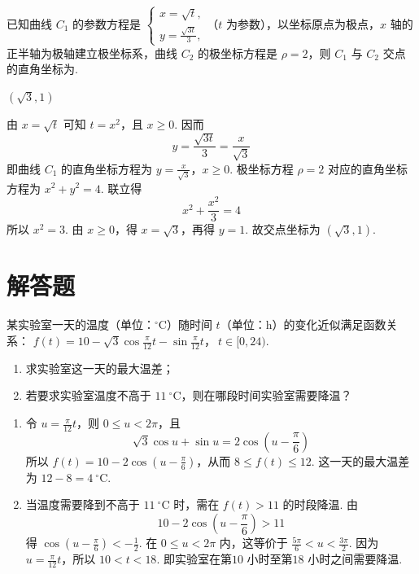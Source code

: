 \begin{problem}
已知曲线 \(C_{1}\) 的参数方程是 \(\begin{cases}
x = \sqrt{t},\\
y = \frac{\sqrt{3t}}{3},
\end{cases}\)（\(t\) 为参数），以坐标原点为极点，\(x\) 轴的正半轴为极轴建立极坐标系，曲线 \(C_{2}\) 的极坐标方程是 \(\rho = 2\)，则 \(C_{1}\) 与 \(C_{2}\) 交点的直角坐标为\fillinblank{}.
\end{problem}

\begin{answer}
\((\sqrt{3},1)\)
\end{answer}

\begin{solution}
由 \(x=\sqrt t\) 可知 \(t=x^2\)，且 \(x\geqslant0\). 因而
\[
y=\frac{\sqrt{3t}}{3}=\frac{x}{\sqrt3}
\]
即曲线 \(C_1\) 的直角坐标方程为 \(y=\frac{x}{\sqrt3}\)，\(x\geqslant0\). 极坐标方程 \(\rho=2\) 对应的直角坐标方程为 \(x^2+y^2=4\). 联立得
\[
x^2+\frac{x^2}{3}=4
\]
所以 \(x^2=3\). 由 \(x\geqslant0\)，得 \(x=\sqrt3\)，再得 \(y=1\). 故交点坐标为 \((\sqrt3,1)\).
\end{solution}

\section{解答题}

\begin{problem}
某实验室一天的温度（单位：\(^{\circ}\mathrm{C}\)）随时间 \(t\)（单位：\(\mathrm{h}\)）的变化近似满足函数关系： \(f(t) = 10 - \sqrt{3}\cos \frac{\pi}{12}t - \sin \frac{\pi}{12}t\)，\(\ t \in [0, 24)\).
\begin{enumerate}
\item 求实验室这一天的最大温差；
\item 若要求实验室温度不高于 \(11 \mathrm{~^{\circ}C}\)，则在哪段时间实验室需要降温？
\end{enumerate}
\end{problem}

\begin{solution}
\begin{enumerate}
\item 令 \(u=\frac{\pi}{12}t\)，则 \(0\leqslant u<2\pi\)，且
\[
\sqrt3\cos u+\sin u=2\cos\left(u-\frac{\pi}{6}\right)
\]
所以 \(f(t)=10-2\cos\left(u-\frac{\pi}{6}\right)\)，从而 \(8\leqslant f(t)\leqslant12\). 这一天的最大温差为 \(12-8=4 \mathrm{~^{\circ}C}\).
\item 当温度需要降到不高于 \(11 \mathrm{~^{\circ}C}\) 时，需在 \(f(t)>11\) 的时段降温. 由
\[
10-2\cos\left(u-\frac{\pi}{6}\right)>11
\]
得 \(\cos\left(u-\frac{\pi}{6}\right)<-\frac12\). 在 \(0\leqslant u<2\pi\) 内，这等价于 \(\frac{5\pi}{6}<u<\frac{3\pi}{2}\). 因为 \(u=\frac{\pi}{12}t\)，所以 \(10<t<18\). 即实验室在第\(10\text{ 小时}\)至第\(18\text{ 小时}\)之间需要降温.
\end{enumerate}
\end{solution}

